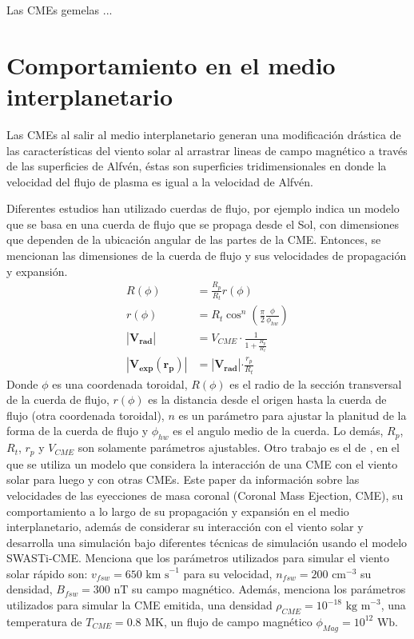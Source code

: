 Las \acp{CME} gemelas ...


\section{Comportamiento en el medio interplanetario}
Las \acp{CME} al salir al medio interplanetario generan una modificación drástica de las características del viento solar al arrastrar lineas de campo magnético a través de las superficies de Alfvén, éstas son superficies tridimensionales en donde la velocidad del flujo de plasma es igual a la velocidad de Alfvén.

Diferentes estudios han utilizado cuerdas de flujo, por ejemplo \cite{singh-2025} indica un modelo que se basa en una cuerda de flujo que se propaga desde el Sol, con dimensiones que dependen de la ubicación angular de las partes de la CME. Entonces, se mencionan las dimensiones de la cuerda de flujo y sus velocidades de propagación y expansión.
\begin{align}
    R(\phi)&=\frac{R_p}{R_t}r(\phi)\\
    r(\phi)&=R_t\cos^n\left(\frac{\pi}{2}\frac{\phi}{\phi_{hw}}\right)\\
    |\mathbf{V_{rad}}| &= V_{CME} \cdot \frac{1}{1+\frac{R_p}{R_t}}\\
    \mathbf{|V_{exp}(r_p)|} &= \mathbf{|V_{rad}|}{ \cdot \frac{r_p}{R_t}}
\end{align}
Donde $\phi$ es una coordenada toroidal, $R(\phi)$ es el radio de la sección transversal de la cuerda de flujo, $r(\phi)$ es la distancia desde el origen hasta la cuerda de flujo (otra coordenada toroidal), $n$ es un parámetro para ajustar la planitud de la forma de la cuerda de flujo y $\phi_{hw}$ es el angulo medio de la cuerda. Lo demás, $R_p$, $R_t$, $r_p$ y $V_{CME}$ son solamente parámetros ajustables.
Otro trabajo es el de \cite{mayank-2023}, en el que se utiliza un modelo que considera la interacción de una \ac{CME} con el viento solar para luego y con otras CMEs. Este paper da información sobre las velocidades de las eyecciones de masa coronal (Coronal Mass Ejection, CME), su comportamiento a lo largo de su propagación y expansión en el medio interplanetario, además de considerar su interacción con el viento solar y desarrolla una simulación bajo diferentes técnicas de simulación usando el modelo SWASTi-CME. Menciona que los parámetros utilizados para simular el viento solar rápido son: $v_{fsw}=650\text{  km s}^{-1}$ para su velocidad, $n_{fsw}=200 \text{  cm}^{-3}$ su densidad, $B_{fsw}=300\text{  nT}$ su campo magnético. Además, menciona los parámetros utilizados para simular la \ac{CME} emitida, una densidad $\rho_{CME}=10^{-18}\text{  kg m}^{-3}$, una temperatura de $T_{CME}=0.8\text{ MK}$, un flujo de campo magnético $\phi_{Mag}=10^{12}\text{ Wb}$.

